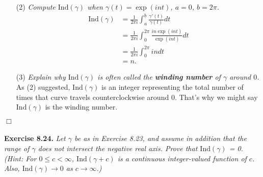 \documentclass{article}
\begin{document}
\begin{enumerate}
\item[(2)]
\emph{Compute $\mathrm{Ind}(\gamma)$ when $\gamma(t) = \exp(int)$, $a=0$, $b=2\pi$.}
\begin{align*}
  \mathrm{Ind}(\gamma)
  &= \frac{1}{2\pi i}\int_{a}^{b} \frac{\gamma'(t)}{\gamma(t)} dt \\
  &= \frac{1}{2\pi i}\int_{0}^{2\pi} \frac{in\exp(int)}{\exp(int)} dt \\
  &= \frac{1}{2\pi i}\int_{0}^{2\pi} in dt \\
  &= n.
\end{align*}

\item[(3)]
\emph{Explain why $\mathrm{Ind}(\gamma)$ is often called the
\textbf{winding number} of $\gamma$ around $0$.}
As (2) suggested,
$\mathrm{Ind}(\gamma)$ is an integer
representing the total number of times that curve travels counterclockwise around $0$.
That's why we might say $\mathrm{Ind}(\gamma)$ is the winding number.
\end{enumerate}
$\Box$ \\\\






\textbf{Exercise 8.24.}
\emph{Let $\gamma$ be as in Exercise 8.23, and assume in addition that
the range of $\gamma$ does not intersect the negative real axis.
Prove that $\mathrm{Ind}(\gamma)$ = 0.
(Hint: For $0 \leq c < \infty$, $\mathrm{Ind}(\gamma+c)$ is a continuous
integer-valued function of $c$.
Also, $\mathrm{Ind}(\gamma) \to 0$ as $c \to \infty$.)} \\
\end{document}
